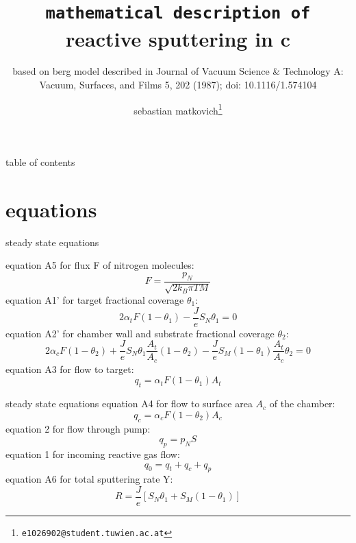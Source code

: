 \documentclass{beamer}
\title{\texttt{mathematical description of} reactive sputtering in c}
\subtitle{based on berg model described in Journal of Vacuum Science \& Technology A: Vacuum, Surfaces, and Films 5, 202 (1987); doi:
10.1116/1.574104}
\author{sebastian matkovich\footnote{\texttt{e1026902@student.tuwien.ac.at}}}
\begin{document}
\begin{frame}
  \maketitle
\end{frame}

\begin{frame}{table of contents}
  \tableofcontents
\end{frame}

\section{equations}

\begin{frame}{steady state equations}


equation A5 for flux F of nitrogen molecules:
	  \begin{equation} F=\frac{p_{N}}{\sqrt{2k_{B}\pi TM}}  \end{equation}
equation A1' for target fractional coverage $\theta_{1}$:
	  \begin{equation} 2\alpha_{t}F(1-\theta_{1})-\frac{J}{e}S_{N}\theta_{1}=0  \end{equation}
equation A2' for chamber wall and substrate fractional coverage $\theta_{2}$:
	  \begin{equation} 2\alpha_{c}F(1-\theta_{2})+\frac{J}{e}S_{N}\theta_{1}\frac{A_{t}}{A_{c}}(1-\theta_{2})-\frac{J}{e}S_{M}(1-\theta_{1})\frac{A_{t}}{A_{c}}\theta_{2}=0 \end{equation}
equation A3 for flow to target:
	  \begin{equation} q_{t}=\alpha_{t}F(1-\theta_{1})A_{t}  \end{equation}
\end{frame}
\begin{frame}{steady state equations}
equation A4 for flow to surface area $A_{c}$ of the chamber:
	  \begin{equation} q_{c}=\alpha_{c}F(1-\theta_{2})A_{c}  \end{equation}
equation 2 for flow through pump:
		  \begin{equation} q_{p}=p_{N}S  \end{equation}
equation 1 for incoming reactive gas flow:
	  \begin{equation} q_{0}=q_{t}+q_{c}+q_{p}  \end{equation}
equation A6 for total sputtering rate Y:
	\begin{equation} R=\frac{J}{e}[S_{N}\theta_{1}+S_{M}(1-\theta_{1})] \end{equation}

\end{frame}
\end{document}

